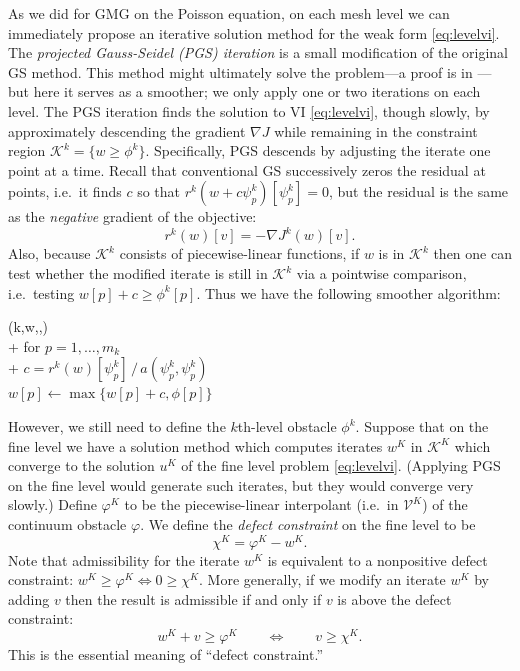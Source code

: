 \documentclass[letterpaper,final,12pt,reqno]{amsart}
\theoremstyle{claim}
\newcommand{\grad}{\nabla}
\numberwithin{equation}{section}
\numberwithin{figure}{section}
\numberwithin{table}{section}
\begin{document}
As we did for GMG on the Poisson equation, on each mesh level we can immediately propose an iterative solution method for the weak form \eqref{eq:levelvi}.  The \emph{projected Gauss-Seidel (PGS) iteration} is a small modification of the original GS method.  This method might ultimately solve the problem---a proof is in \cite{BrandtCryer1983}---but here it serves as a smoother; we only apply one or two iterations on each level.  The PGS iteration finds the solution to VI \eqref{eq:levelvi}, though slowly, by approximately descending the gradient $\grad J$ while remaining in the constraint region $\mathcal{K}^k = \{w\ge \phi^k\}$.  Specifically, PGS descends by adjusting the iterate one point at a time.  Recall that conventional GS successively zeros the residual at points, i.e.~it finds $c$ so that $r^k(w+c\psi_p^k)[\psi_p^k]=0$, but the residual is the same as the \emph{negative} gradient of the objective:
\begin{equation}
  r^k(w)[v] = - \grad J^k(w)[v].  \label{eq:levelresidualgradient}
\end{equation}
Also, because $\mathcal{K}^k$ consists of piecewise-linear functions, if $w$ is in $\mathcal{K}^k$ then one can test whether the modified iterate is still in $\mathcal{K}^k$ via a pointwise comparison, i.e.~testing $w[p] + c \ge \phi^k[p]$.  Thus we have the following smoother algorithm:
\begin{pseudo*}
(k,w,\ell,\phi)\text{:} \\+
    for $p=1,\dots,m_k$ \\+
        $\displaystyle c = r^k(w)[\psi_p^k] \, \big/ \,a(\psi_p^k,\psi_p^k)$ \qquad {} \\
        $w[p] \gets \max\{w[p] + c,\phi[p]\}$
\end{pseudo*}

However, we still need to define the $k$th-level obstacle $\phi^k$.  Suppose that on the fine level we have a solution method which computes iterates $w^K$ in $\mathcal{K}^K$ which converge to the solution $u^K$ of the fine level problem \eqref{eq:levelvi}.  (Applying PGS on the fine level would generate such iterates, but they would converge very slowly.)  Define $\varphi^K$ to be the piecewise-linear interpolant (i.e.~in $\mathcal{V}^K$) of the continuum obstacle $\varphi$.  We define the \emph{defect constraint} \cite{GraeserKornhuber2009} on the fine level to be
\begin{equation}
  \chi^K = \varphi^K - w^K.  \label{eq:defectconstraint}
\end{equation}
Note that admissibility for the iterate $w^K$ is equivalent to a nonpositive defect constraint: $w^K \ge \varphi^K \iff 0 \ge \chi^K$.  More generally, if we modify an iterate $w^K$ by adding $v$ then the result is admissible if and only if $v$ is above the defect constraint:
\begin{equation}
  w^K + v \ge \varphi^K  \qquad \iff \qquad v \ge \chi^K.  \label{eq:defectmeaning}
\end{equation}
This is the essential meaning of ``defect constraint.''
\end{document}
